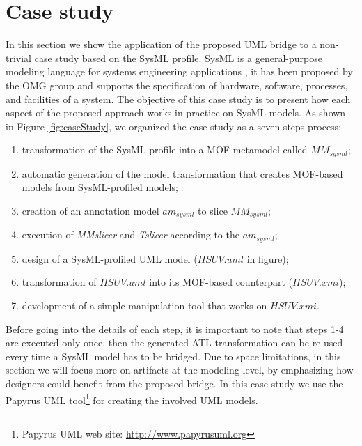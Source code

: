 \section{Case study}\label{sec:caseStudy}
In this section we show the application of the proposed UML bridge to a non-trivial case study based on the SysML profile.
SysML is a general-purpose modeling language for systems engineering applications \cite{sysml}, it has been proposed by the OMG group
and supports the specification of  hardware, software, processes, and facilities of a system.
The objective of this case study is to present how each aspect of the proposed approach works in practice on SysML models.
As shown in Figure \ref{fig:caseStudy}, we organized the case study as a seven-steps process:
%
\begin{enumerate}
	\item transformation of the SysML profile into a MOF metamodel called $MM_{sysml}$;
	\item automatic generation of the model transformation that creates MOF-based models from SysML-profiled models;
	\item creation of an annotation model $am_{sysml}$ to slice $MM_{sysml}$;
	\item execution of \textit{MMslicer} and \textit{Tslicer} according to the $am_{sysml}$;
	\item design of a SysML-profiled UML model ($HSUV.uml$ in figure);
	\item transformation of $HSUV.uml$ into its MOF-based counterpart ($HSUV.xmi$);
	\item development of a simple manipulation tool that works on $HSUV.xmi$.
\end{enumerate}
%
Before going into the details of each step, it is important to note that steps 1-4 are executed only once, 
then the generated ATL transformation can be re-used every time a SysML model has to be bridged.
Due to space limitations, in this section we will focus more on artifacts at the modeling level, by emphasizing
how designers could benefit from the proposed bridge.
In this case study we use the Papyrus UML tool\footnote{Papyrus UML web site: \small{\url{http://www.papyrusuml.org}}} for
creating the involved UML models. 


